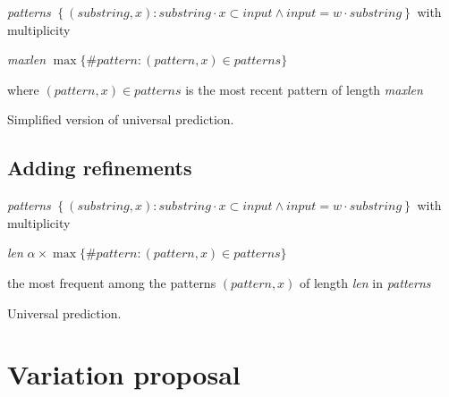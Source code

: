 \documentclass[a4paper,12pt]{article}
\begin{document}

    \begin{algorithm}

      \textit{patterns} \gets{}
        $\left\{ (\textit{substring},x) :%
        \textit{substring}\cdot x\subset\textit{input} \wedge
        \textit{input} = w\cdot\textit{substring} \right\}$
        with multiplicity\;

      \textit{maxlen} \gets{} $\max\{\#\textit{pattern} :
        (\textit{pattern},x)\in\textit{patterns}\}$\;

       where $(\textit{pattern},x)\in\textit{patterns}$ is the most
        recent pattern of length \textit{maxlen}\;

      \caption{\label{simplified}Simplified version of universal prediction.}
    \end{algorithm}


  \subsection{Adding refinements}

    \begin{algorithm}

      \textit{patterns} \gets{}
        $\left\{ (\textit{substring},x) :%
        \textit{substring}\cdot x\subset\textit{input} \wedge
        \textit{input} = w\cdot\textit{substring} \right\}$
        with multiplicity\;

      \textit{len} \gets{} $\alpha\times\max\{\#\textit{pattern} :
        (\textit{pattern},x)\in\textit{patterns}\}$\;

       the most frequent among the patterns $(\textit{pattern},x)$
        of length \textit{len} in \textit{patterns}\;

      \caption{\label{complete}Universal prediction.}
    \end{algorithm}

    \section{Variation proposal}\label{variation_algo}
\end{document}
